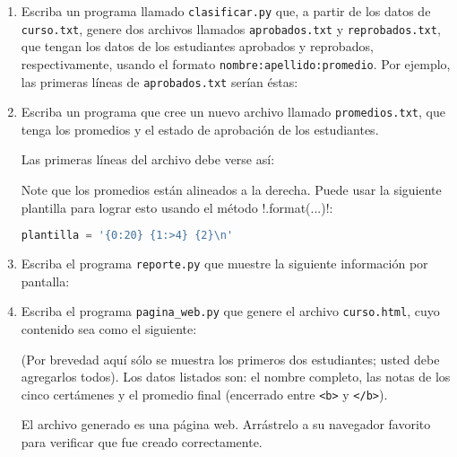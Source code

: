 \documentclass[12pt,spanish]{article}
\begin{document}
  \begin{enumerate}[leftmargin=0pt]

    \item
      Escriba un programa llamado \texttt{clasificar.py} que,
      a partir de los datos de \texttt{curso.txt}, genere dos archivos
      llamados \texttt{aprobados.txt} y \texttt{reprobados.txt},
      que tengan los datos de los estudiantes aprobados y reprobados,
      respectivamente,
      usando el formato \texttt{nombre:apellido:promedio}.
      Por ejemplo,
      las primeras líneas de \texttt{aprobados.txt} serían éstas:
      

    \item
      Escriba un programa que
      cree un nuevo archivo llamado \texttt{promedios.txt},
      que tenga los promedios y el estado de aprobación
      de los estudiantes.

      Las primeras líneas del archivo debe verse así:
      

      Note que los promedios están alineados a la derecha.
      Puede usar la siguiente plantilla para lograr esto
      usando el método \li!.format(...)!:
      \begin{lstlisting}[language=py,frame=none]
plantilla = '{0:20} {1:>4} {2}\n'
      \end{lstlisting}

      \newpage

    \item
      Escriba el programa \texttt{reporte.py}
      que muestre la siguiente información por pantalla:
      

    \item
      Escriba el programa \texttt{pagina\_web.py}
      que genere el archivo \texttt{curso.html},
      cuyo contenido sea como el siguiente:
      
      (Por brevedad aquí sólo se muestra los primeros dos estudiantes;
      usted debe agregarlos todos).
      Los datos listados son:
      el nombre completo,
      las notas de los cinco certámenes
      y el promedio final (encerrado entre \verb+<b>+ y \verb+</b>+).

      El archivo generado es una página web.
      Arrástrelo a su navegador favorito
      para verificar que fue creado correctamente.

  \end{enumerate}
\end{document}
